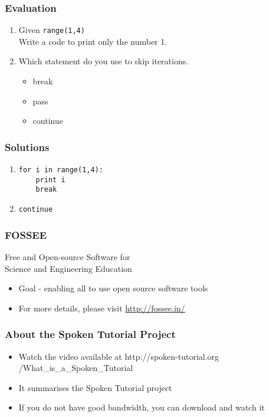 \documentclass[17pt,compress]{beamer}
\begin{document}
\begin{frame}
\frametitle{Evaluation}
\label{sec-8}


\begin{enumerate}
\item Given \texttt{range(1,4)} \\ Write a code to print only the number 1.\pause
\vspace{12pt}
\item Which statement do you use to skip iterations.\pause
\begin{itemize}
\item break
\item pass
\item continue
\end{itemize}
\end{enumerate}
\end{frame}
\begin{frame}[fragile]
\frametitle{Solutions}
\label{sec-9}


\begin{enumerate}
\item \lstset{language=Python}
\begin{lstlisting}
for i in range(1,4):
    print i
    break
\end{lstlisting}\pause
\vspace{8pt}
\item \texttt{continue}
\end{enumerate}
\end{frame}
\begin{frame}
\frametitle{FOSSEE}
{\color{blue}Free and Open-source Software for \\Science and Engineering Education} \\
\begin{itemize}
\item Goal - enabling all to use open source software tools
\item For more details, please visit {\color{blue}\url{http://fossee.in/}}
\end{itemize}
\end{frame}
\begin{frame}
\frametitle{About the Spoken Tutorial Project}
\begin{itemize}
\item Watch the video available at {\color{blue}http://spoken-tutorial.org /What\_is\_a\_Spoken\_Tutorial}
\item It summarises the Spoken Tutorial project \pause
\item If you do not have good bandwidth, you can download and watch it
\end{itemize}
\end{frame}
\end{document}
